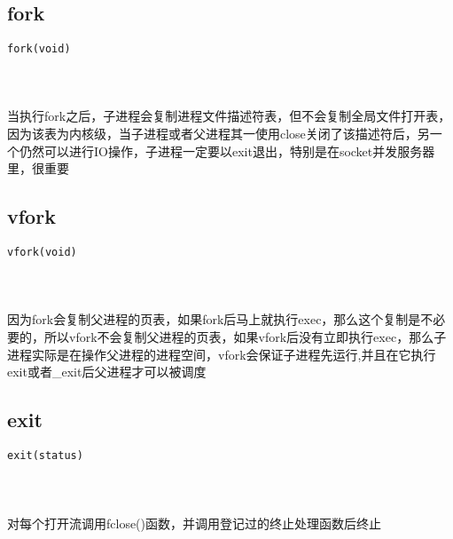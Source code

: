 \documentclass[10pt,a4paper]{article}
\begin{document}
\section{\color[rgb]{0.2,0.4,0.6}{进程生成}}
\subsection{fork}
\begin{spacing}{2.0}
\lstset{language=C,numbers=none}
\begin{lstlisting}
fork(void)
\end{lstlisting}
{\large\color[rgb]{0.2,0.4,0.6}{void:}}
\paragraph{ \ \ }当执行fork之后，子进程会复制进程文件描述符表，但不会复制全局文件打开表，因为该表为内核级，当子进程或者父进程其一使用close关闭了该描述符后，另一个仍然可以进行IO操作，子进程一定要以exit退出，特别是在socket并发服务器里，很重要
\end{spacing}

\subsection{vfork}
\begin{spacing}{2.0}
\lstset{language=C,numbers=none}
\begin{lstlisting}
vfork(void)
\end{lstlisting}
{\large\color[rgb]{0.2,0.4,0.6}{void:}}
\paragraph{ \ \ }因为fork会复制父进程的页表，如果fork后马上就执行exec，那么这个复制是不必要的，所以vfork不会复制父进程的页表，如果vfork后没有立即执行exec，那么子进程实际是在操作父进程的进程空间，vfork会保证子进程先运行,并且在它执行exit或者\_exit后父进程才可以被调度
\end{spacing}

\subsection{exit}
\begin{spacing}{2.0}
\lstset{language=C,numbers=none}
\begin{lstlisting}
exit(status)
\end{lstlisting}
{\large\color[rgb]{0.2,0.4,0.6}{status:}}
\paragraph{ \ \ }对每个打开流调用fclose()函数，并调用登记过的终止处理函数后终止
\end{spacing}
\end{document}
